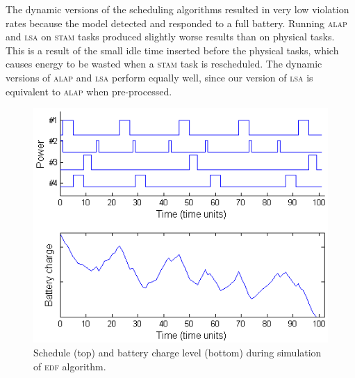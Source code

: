 The dynamic versions of the scheduling algorithms resulted in very low violation rates because the model detected 
and responded to a full battery.  Running \textsc{alap} and \textsc{lsa} on \textsc{stam} tasks produced slightly worse 
results than on physical tasks.  This is a result of the small idle time inserted before the physical tasks, 
which causes energy to be wasted when a \textsc{stam} task is rescheduled.
The dynamic versions of \textsc{alap} and \textsc{lsa} perform equally well, since our version of \textsc{lsa} is equivalent to \textsc{alap} when pre-processed. %

\begin{figure}[tb]
\begin{center}
\includegraphics[scale=0.59]{edfbattery.png}
\caption{Schedule (top) and battery charge level (bottom) during simulation of \textsc{edf} algorithm.\label{fig:edfbattery}}
\end{center}
\end{figure}

